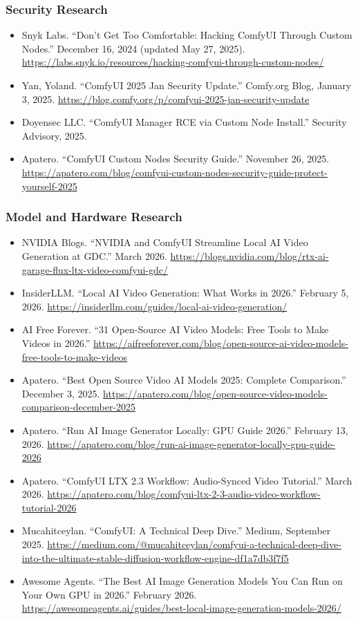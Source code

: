 \documentclass[11pt,letterpaper]{article}
\begin{document}
\subsubsection{Security Research}
\begin{itemize}[leftmargin=1.5em]
  \item Snyk Labs. ``Don't Get Too Comfortable: Hacking ComfyUI Through Custom Nodes.'' December 16, 2024 (updated May 27, 2025). \url{https://labs.snyk.io/resources/hacking-comfyui-through-custom-nodes/}
  \item Yan, Yoland. ``ComfyUI 2025 Jan Security Update.'' Comfy.org Blog, January 3, 2025. \url{https://blog.comfy.org/p/comfyui-2025-jan-security-update}
  \item Doyensec LLC. ``ComfyUI Manager RCE via Custom Node Install.'' Security Advisory, 2025.
  \item Apatero. ``ComfyUI Custom Nodes Security Guide.'' November 26, 2025. \url{https://apatero.com/blog/comfyui-custom-nodes-security-guide-protect-yourself-2025}
\end{itemize}

\subsubsection{Model and Hardware Research}
\begin{itemize}[leftmargin=1.5em]
  \item NVIDIA Blogs. ``NVIDIA and ComfyUI Streamline Local AI Video Generation at GDC.'' March 2026. \url{https://blogs.nvidia.com/blog/rtx-ai-garage-flux-ltx-video-comfyui-gdc/}
  \item InsiderLLM. ``Local AI Video Generation: What Works in 2026.'' February 5, 2026. \url{https://insiderllm.com/guides/local-ai-video-generation/}
  \item AI Free Forever. ``31 Open-Source AI Video Models: Free Tools to Make Videos in 2026.'' \url{https://aifreeforever.com/blog/open-source-ai-video-models-free-tools-to-make-videos}
  \item Apatero. ``Best Open Source Video AI Models 2025: Complete Comparison.'' December 3, 2025. \url{https://apatero.com/blog/open-source-video-models-comparison-december-2025}
  \item Apatero. ``Run AI Image Generator Locally: GPU Guide 2026.'' February 13, 2026. \url{https://apatero.com/blog/run-ai-image-generator-locally-gpu-guide-2026}
  \item Apatero. ``ComfyUI LTX 2.3 Workflow: Audio-Synced Video Tutorial.'' March 2026. \url{https://apatero.com/blog/comfyui-ltx-2-3-audio-video-workflow-tutorial-2026}
  \item Mucahitceylan. ``ComfyUI: A Technical Deep Dive.'' Medium, September 2025. \url{https://medium.com/@mucahitceylan/comfyui-a-technical-deep-dive-into-the-ultimate-stable-diffusion-workflow-engine-df1a7db3f7f5}
  \item Awesome Agents. ``The Best AI Image Generation Models You Can Run on Your Own GPU in 2026.'' February 2026. \url{https://awesomeagents.ai/guides/best-local-image-generation-models-2026/}
\end{itemize}
\end{document}
